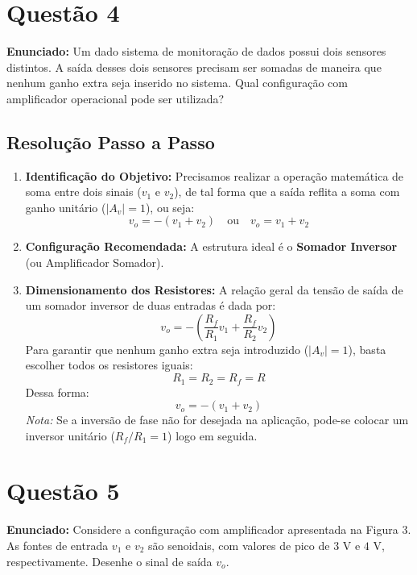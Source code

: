 \section*{Questão 4}
\textbf{Enunciado:} Um dado sistema de monitoração de dados possui dois sensores distintos. A saída desses dois sensores precisam ser somadas de maneira que nenhum ganho extra seja inserido no sistema. Qual configuração com amplificador operacional pode ser utilizada?

\subsection*{Resolução Passo a Passo}
\begin{enumerate}
    \item \textbf{Identificação do Objetivo:}
    Precisamos realizar a operação matemática de soma entre dois sinais ($v_1$ e $v_2$), de tal forma que a saída reflita a soma com ganho unitário ($|A_v| = 1$), ou seja:
    \begin{equation*}
        v_o = -(v_1 + v_2) \quad \text{ou} \quad v_o = v_1 + v_2
    \end{equation*}

    \item \textbf{Configuração Recomendada:}
    A estrutura ideal é o \textbf{Somador Inversor} (ou Amplificador Somador).
    
    \item \textbf{Dimensionamento dos Resistores:}
    A relação geral da tensão de saída de um somador inversor de duas entradas é dada por:
    \begin{equation*}
        v_o = -\left( \frac{R_f}{R_1} v_1 + \frac{R_f}{R_2} v_2 \right)
    \end{equation*}
    Para garantir que nenhum ganho extra seja introduzido ($|A_v| = 1$), basta escolher todos os resistores iguais:
    \begin{equation*}
        R_1 = R_2 = R_f = R
    \end{equation*}
    Dessa forma:
    \begin{equation*}
        v_o = -(v_1 + v_2)
    \end{equation*}
    \textit{Nota:} Se a inversão de fase não for desejada na aplicação, pode-se colocar um inversor unitário ($R_f/R_1 = 1$) logo em seguida.
\end{enumerate}



\section*{Questão 5}
\textbf{Enunciado:} Considere a configuração com amplificador apresentada na Figura 3. As fontes de entrada $v_1$ e $v_2$ são senoidais, com valores de pico de $3\text{ V}$ e $4\text{ V}$, respectivamente. Desenhe o sinal de saída $v_o$.

